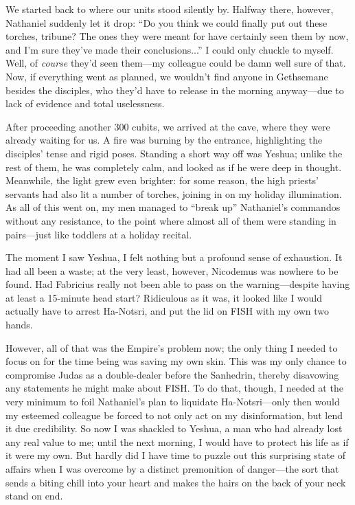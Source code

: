 We started back to where our units stood silently by. Halfway there, however, Nathaniel suddenly let it drop: ``Do you think we could finally put out these torches, tribune? The ones they were meant for have certainly seen them by now, and I'm sure they've made their conclusions...'' I could only chuckle to myself. Well, of \emph{course} they'd seen them---my colleague could be damn well sure of that. Now, if everything went as planned, we wouldn't find anyone in Gethsemane besides the disciples, who they'd have to release in the morning anyway---due to lack of evidence and total uselessness.

After proceeding another 300 cubits, we arrived at the cave, where they were already waiting for us. A fire was burning by the entrance, highlighting the disciples' tense and rigid poses. Standing a short way off was Yeshua; unlike the rest of them, he was completely calm, and looked as if he were deep in thought. Meanwhile, the light grew even brighter: for some reason, the high priests' servants had also lit a number of torches, joining in on my holiday illumination. As all of this went on, my men managed to ``break up'' Nathaniel's commandos without any resistance, to the point where almost all of them were standing in pairs---just like toddlers at a holiday recital.

The moment I saw Yeshua, I felt nothing but a profound sense of exhaustion. It had all been a waste; at the very least, however, Nicodemus was nowhere to be found. Had Fabricius really not been able to pass on the warning---despite having at least a 15-minute head start? Ridiculous as it was, it looked like I would actually have to arrest Ha-Notsri, and put the lid on FISH with my own two hands.

However, all of that was the Empire's problem now; the only thing I needed to focus on for the time being was saving my own skin. This was my only chance to compromise Judas as a double-dealer before the Sanhedrin, thereby disavowing any statements he might make about FISH. To do that, though, I needed at the very minimum to foil Nathaniel's plan to liquidate Ha-Notsri---only then would my esteemed colleague be forced to not only act on my disinformation, but lend it due credibility. So now I was shackled to Yeshua, a man who had already lost any real value to me; until the next morning, I would have to protect his life as if it were my own. But hardly did I have time to puzzle out this surprising state of affairs when I was overcome by a distinct premonition of danger---the sort that sends a biting chill into your heart and makes the hairs on the back of your neck stand on end.

